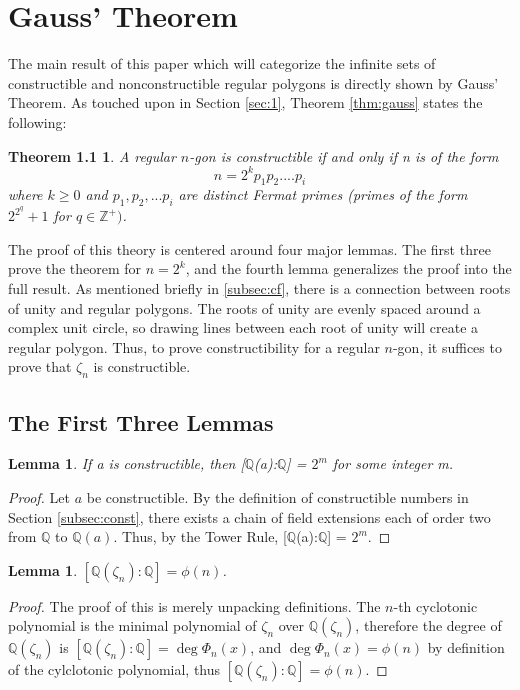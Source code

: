 \documentclass[reqno]{amsart}
\newtheorem*{theoremLESS}{Theorem 1.1}
\newtheorem{lemma}[theorem]{Lemma}
\theoremstyle{definition}
\numberwithin{equation}{section}
\newcommand{\bQ}{\mathbb{Q}}
\newcommand{\bZ}{\mathbb{Z}}
\begin{document}
\section{Gauss' Theorem}\label{sec:4}

The main result of this paper which will categorize the infinite sets of constructible and nonconstructible regular polygons is directly shown by Gauss' Theorem. As touched upon in Section \ref{sec:1}, Theorem \ref{thm:gauss} states the following:

\begin{theoremLESS}A regular $n$-gon is constructible if and only if n is of the form $$n = 2^kp_1p_2....p_i$$ where $k \ge 0$ and $p_1,p_2,...p_i$ are distinct Fermat primes (primes of the form $2^{2^q} + 1$ for $q \in \bZ^+)$.\end{theoremLESS}

The proof of this theory is centered around four major lemmas. The first three prove the theorem for $n=2^k$, and the fourth lemma generalizes the proof into the full result. As mentioned briefly in \ref{subsec:cf}, there is a connection between roots of unity and regular polygons. The roots of unity are evenly spaced around a complex unit circle, so drawing lines between each root of unity will create a regular polygon. Thus, to prove constructibility for a regular $n$-gon, it suffices to prove that $\zeta_n$ is constructible. 

\subsection{The First Three Lemmas}\label{subsec:ftl}

\begin{lemma}\label{lem:1}
If a is constructible, then [$\bQ$(a):$\bQ$] = $2^m$ for some integer m.
\end{lemma}
\begin{proof}
Let $a$ be constructible. By the definition of constructible numbers in Section \ref{subsec:const}, there exists a chain of field extensions each of order two from $\bQ$ to $\bQ(a)$. Thus, by the Tower Rule, [$\bQ$(a):$\bQ$] = $2^m$.
\end{proof}

\begin{lemma}\label{lem:2}
$[\bQ(\zeta_n):\bQ] = \phi(n)$.
\end{lemma}
\begin{proof}
The proof of this is merely unpacking definitions. The $n$-th cyclotonic polynomial is the minimal polynomial of $\zeta_n$ over $\bQ(\zeta_n)$, therefore the degree of $\bQ(\zeta_n)$ is $[\bQ(\zeta_n):\bQ] = \deg\Phi_n(x)$, and $\deg\Phi_n(x) = \phi(n)$ by definition of the cylclotonic polynomial, thus $[\bQ(\zeta_n):\bQ] = \phi(n)$.
\end{proof}
\end{document}
